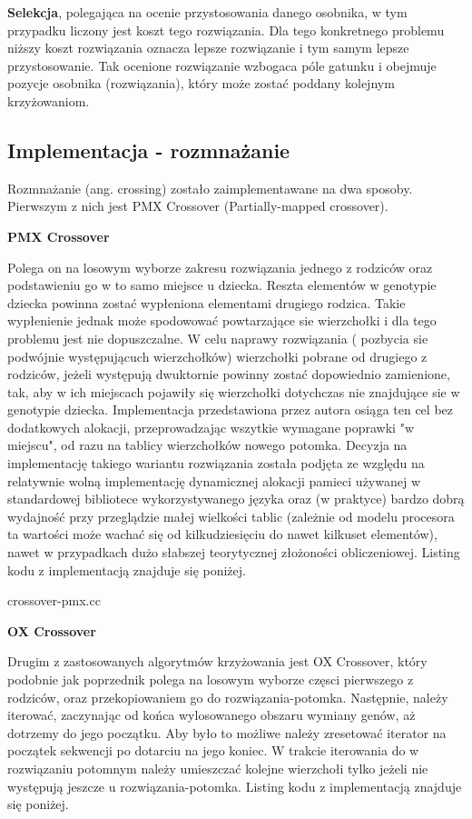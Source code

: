 \documentclass[polish,polish,a4paper]{article}
\begin{document}
\par \textbf{Selekcja},
polegająca na ocenie przystosowania danego osobnika, w tym przypadku liczony jest koszt tego rozwiązania.
Dla tego konkretnego problemu niższy koszt rozwiązania oznacza lepsze rozwiązanie i tym samym lepsze przystosowanie.
Tak ocenione rozwiązanie wzbogaca póle gatunku i obejmuje pozycje osobnika (rozwiązania), który może zostać poddany kolejnym krzyżowaniom.

\subsection{Implementacja - rozmnażanie}
Rozmnażanie (ang. crossing) zostało zaimplementawane na dwa sposoby. Pierwszym z nich jest PMX Crossover (Partially-mapped crossover).

\par \textbf{PMX Crossover}
\par Polega on na losowym
wyborze zakresu rozwiązania jednego z rodziców oraz podstawieniu go w to samo miejsce u dziecka. Reszta elementów w genotypie dziecka powinna zostać 
wypłeniona elementami drugiego rodzica. Takie wypłenienie jednak może spodowować powtarzające sie wierzchołki i dla tego problemu jest nie dopuszczalne.
W celu naprawy rozwiązania ( pozbycia sie podwójnie występującuch wierzchołków) wierzchołki pobrane od drugiego z rodziców, jeżeli występują dwuktornie
powinny zostać dopowiednio zamienione, tak, aby w ich miejscach pojawiły się wierzchołki dotychczas nie znajdujące sie w genotypie dziecka.
Implementacja przedstawiona przez autora osiąga ten cel bez dodatkowych alokacji, przeprowadzając wszytkie wymagane poprawki "w miejscu", od razu na
tablicy wierzchołków nowego potomka. Decyzja na implementację takiego wariantu rozwiązania została podjęta ze względu na relatywnie wolną implementację
dynamicznej alokacji pamieci używanej w standardowej bibliotece wykorzystywanego języka oraz (w praktyce) bardzo dobrą wydajność przy przeglądzie
małej wielkości tablic (zależnie od modelu procesora ta wartości może wachać się od kilkudziesięciu do nawet kilkuset elementów), nawet w przypadkach
dużo słabszej teorytycznej złożoności obliczeniowej.
Listing kodu z implementacją znajduje się poniżej.


{crossover-pmx.cc}

\par \textbf{OX Crossover}
\par Drugim z zastosowanych algorytmów krzyżowania jest OX Crossover, który podobnie jak poprzednik polega na losowym wyborze częsci pierwszego z rodziców,
oraz przekopiowaniem go do rozwiązania-potomka. Następnie, należy iterować, zaczynając od końca wylosowanego obszaru wymiany genów, aż dotrzemy do jego
początku. Aby było to możliwe należy zresetować iterator na początek sekwencji po dotarciu na jego koniec. W trakcie iterowania do w rozwiązaniu
potomnym należy umieszczać kolejne wierzchołi tylko jeżeli nie występują jeszcze u rozwiązania-potomka.
Listing kodu z implementacją znajduje się poniżej.
\end{document}
